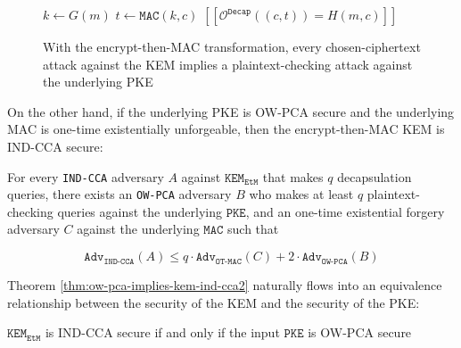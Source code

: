 \documentclass[journal=tches,submission]{iacrtrans}
\newcommand{\pke}{\texttt{PKE}}
\newcommand{\kem}{\texttt{KEM}}
\newcommand{\decap}{\texttt{Decap}}
\newcommand{\etm}{\texttt{EtM}}  %
\newcommand{\mac}{\texttt{MAC}}
\newcommand{\pco}{\texttt{PCO}}
\newcommand{\llbrack}{[\![}
\newcommand{\rrbrack}{]\!]}
\newcommand{\adv}{\texttt{Adv}}
\begin{document}
\begin{figure}[H]
    \centering
    \begin{minipage}{0.45\textwidth}
    \begin{algorithm}[H]
        \caption*{$\pco(m, c)$}
        \begin{algorithmic}[1]
            \State $k \leftarrow G(m)$
            \State $t \leftarrow \mac(k, c)$
            \State \Return $\llbrack \mathcal{O}^\decap((c, t)) = H(m, c)\rrbrack$
        \end{algorithmic}
    \end{algorithm}
    \end{minipage}
    \caption{With the encrypt-then-MAC transformation, every chosen-ciphertext attack against the KEM implies a plaintext-checking attack against the underlying PKE}\label{fig:pco-using-decap-oracle}
\end{figure}

On the other hand, if the underlying PKE is OW-PCA secure and the underlying MAC is one-time existentially unforgeable, then the encrypt-then-MAC KEM is IND-CCA secure:

\begin{theorem}\label{thm:ow-pca-implies-kem-ind-cca2}
    For every \texttt{IND-CCA} adversary $A$ against $\kem_\etm$ that makes $q$ decapsulation queries, there exists an \texttt{OW-PCA} adversary $B$ who makes at least $q$ plaintext-checking queries against the underlying $\pke$, and an one-time existential forgery adversary $C$ against the underlying $\mac$ such that

    \begin{equation*}
        \texttt{Adv}_\texttt{IND-CCA}(A) \leq q \cdot \adv_\texttt{OT-MAC}(C) + 2 \cdot \texttt{Adv}_\texttt{OW-PCA}(B)
    \end{equation*}
\end{theorem}

Theorem \ref{thm:ow-pca-implies-kem-ind-cca2} naturally flows into an equivalence relationship between the security of the KEM and the security of the PKE:

\begin{lemma}
    $\kem_\etm$ is IND-CCA secure if and only if the input $\pke$ is OW-PCA secure
\end{lemma}
\end{document}
